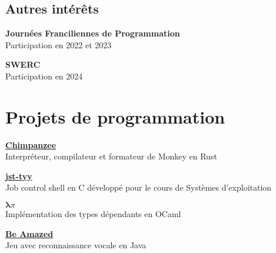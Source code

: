 \documentclass[12pt]{article}
\newcommand{\entry}[4]{{{\textbf{#1}}} \hfill #3 \\ #2 \hfill #4}
\begin{document}
\begin{paracol}{2}
	\medskip
	\switchcolumn

	\section{Autres intérêts}


	\textbf{Journées Franciliennes de Programmation}\\
	\noindent Participation en 2022 et 2023

	\textbf{SWERC}\\
	\noindent Participation en 2024
	\bigskip


\end{paracol}

\section{Projets de programmation}

\begin{paracol}{2}
	\entry{\href{https://github.com/Yag000/chimpanzee}{Chimpanzee}}{Interpréteur, compilateur et formateur de Monkey en Rust}{ }{ }
	\medskip
	\switchcolumn

	\entry{\href{https://github.com/Yag000/jsh-tyy}{jst-tyy}}{Job control shell en C développé pour le cours de Systèmes d'exploitation}{ }{ }
	\medskip
	\switchcolumn

	\entry{\href{https://moule.informatique.univ-paris-diderot.fr/iglesias/U3bbU3c0}{$\pmb\lambda\pi$}}{Implémentation des types dépendants en OCaml}{ }{ }
	\medskip
	\switchcolumn

	\entry{\href{https://github.com/GabinDDL/L2S2-GYTMY-Game}{Be Amazed}}{Jeu avec reconnaissance vocale en Java}{ }{ }
	\medskip
	\switchcolumn
\end{paracol}

\vspace*{\fill}
\end{document}
